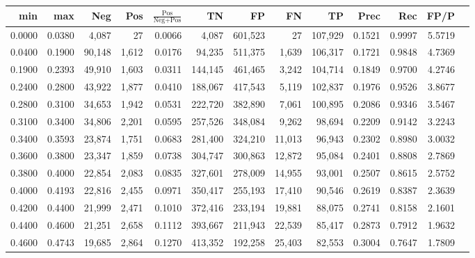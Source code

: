 \begin{tabular}{rrrrrrrrrrrrr}
\toprule
   min &    max &    Neg &   Pos & $\frac{\text{Pos}}{\text{Neg}+\text{Pos}}$ &      TN &      FP &      FN &      TP &   Prec &    Rec &   FP/P \\
\midrule
0.0000 & 0.0380 &  4,087 &    27 &                                     0.0066 &   4,087 & 601,523 &      27 & 107,929 & 0.1521 & 0.9997 & 5.5719 \\
0.0400 & 0.1900 & 90,148 & 1,612 &                                     0.0176 &  94,235 & 511,375 &   1,639 & 106,317 & 0.1721 & 0.9848 & 4.7369 \\
0.1900 & 0.2393 & 49,910 & 1,603 &                                     0.0311 & 144,145 & 461,465 &   3,242 & 104,714 & 0.1849 & 0.9700 & 4.2746 \\
0.2400 & 0.2800 & 43,922 & 1,877 &                                     0.0410 & 188,067 & 417,543 &   5,119 & 102,837 & 0.1976 & 0.9526 & 3.8677 \\
0.2800 & 0.3100 & 34,653 & 1,942 &                                     0.0531 & 222,720 & 382,890 &   7,061 & 100,895 & 0.2086 & 0.9346 & 3.5467 \\
0.3100 & 0.3400 & 34,806 & 2,201 &                                     0.0595 & 257,526 & 348,084 &   9,262 &  98,694 & 0.2209 & 0.9142 & 3.2243 \\
0.3400 & 0.3593 & 23,874 & 1,751 &                                     0.0683 & 281,400 & 324,210 &  11,013 &  96,943 & 0.2302 & 0.8980 & 3.0032 \\
0.3600 & 0.3800 & 23,347 & 1,859 &                                     0.0738 & 304,747 & 300,863 &  12,872 &  95,084 & 0.2401 & 0.8808 & 2.7869 \\
0.3800 & 0.4000 & 22,854 & 2,083 &                                     0.0835 & 327,601 & 278,009 &  14,955 &  93,001 & 0.2507 & 0.8615 & 2.5752 \\
0.4000 & 0.4193 & 22,816 & 2,455 &                                     0.0971 & 350,417 & 255,193 &  17,410 &  90,546 & 0.2619 & 0.8387 & 2.3639 \\
0.4200 & 0.4400 & 21,999 & 2,471 &                                     0.1010 & 372,416 & 233,194 &  19,881 &  88,075 & 0.2741 & 0.8158 & 2.1601 \\
0.4400 & 0.4600 & 21,251 & 2,658 &                                     0.1112 & 393,667 & 211,943 &  22,539 &  85,417 & 0.2873 & 0.7912 & 1.9632 \\
0.4600 & 0.4743 & 19,685 & 2,864 &                                     0.1270 & 413,352 & 192,258 &  25,403 &  82,553 & 0.3004 & 0.7647 & 1.7809 \\

\end{tabular}
